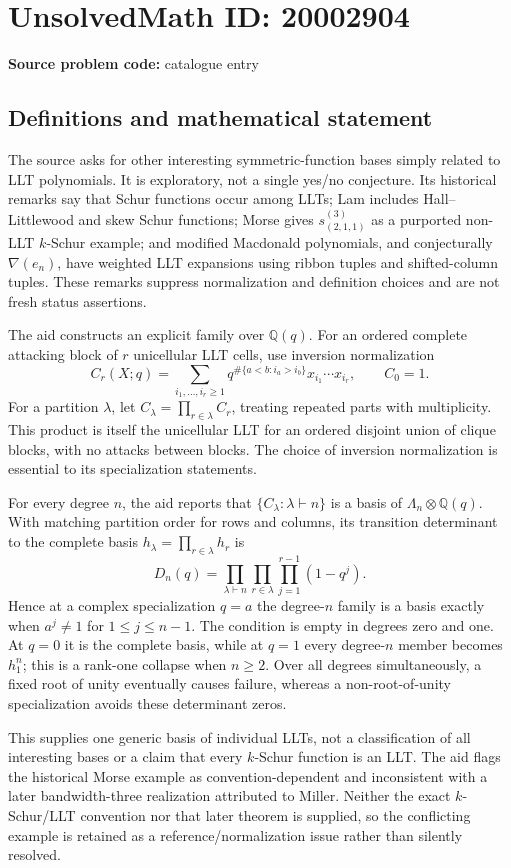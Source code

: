 \documentclass[11pt]{article}
\newcommand{\Q}{\mathbb{Q}}
\begin{document}
\section*{UnsolvedMath ID: 20002904}
\textbf{Source problem code:} catalogue entry
\subsection{Definitions and mathematical statement}
The source asks for other interesting symmetric-function bases simply related to LLT polynomials. It is exploratory, not a single yes/no conjecture. Its historical remarks say that Schur functions occur among LLTs; Lam includes Hall--Littlewood and skew Schur functions; Morse gives $s^{(3)}_{(2,1,1)}$ as a purported non-LLT $k$-Schur example; and modified Macdonald polynomials, and conjecturally $\nabla(e_n)$, have weighted LLT expansions using ribbon tuples and shifted-column tuples. These remarks suppress normalization and definition choices and are not fresh status assertions.

The aid constructs an explicit family over $\Q(q)$. For an ordered complete attacking block of $r$ unicellular LLT cells, use inversion normalization
\[
 C_r(X;q)=\sum_{i_1,\ldots,i_r\ge1}
 q^{\#\{a<b:i_a>i_b\}}x_{i_1}\cdots x_{i_r},\qquad C_0=1.
\]
For a partition $\lambda$, let $C_\lambda=\prod_{r\in\lambda}C_r$, treating repeated parts with multiplicity. This product is itself the unicellular LLT for an ordered disjoint union of clique blocks, with no attacks between blocks. The choice of inversion normalization is essential to its specialization statements.

For every degree $n$, the aid reports that $\{C_\lambda:\lambda\vdash n\}$ is a basis of $\Lambda_n\otimes\Q(q)$. With matching partition order for rows and columns, its transition determinant to the complete basis $h_\lambda=\prod_{r\in\lambda}h_r$ is
\[
 D_n(q)=\prod_{\lambda\vdash n}\prod_{r\in\lambda}
 \prod_{j=1}^{r-1}(1-q^j).
\]
Hence at a complex specialization $q=a$ the degree-$n$ family is a basis exactly when $a^j\ne1$ for $1\le j\le n-1$. The condition is empty in degrees zero and one. At $q=0$ it is the complete basis, while at $q=1$ every degree-$n$ member becomes $h_1^n$; this is a rank-one collapse when $n\ge2$. Over all degrees simultaneously, a fixed root of unity eventually causes failure, whereas a non-root-of-unity specialization avoids these determinant zeros.

This supplies one generic basis of individual LLTs, not a classification of all interesting bases or a claim that every $k$-Schur function is an LLT. The aid flags the historical Morse example as convention-dependent and inconsistent with a later bandwidth-three realization attributed to Miller. Neither the exact $k$-Schur/LLT convention nor that later theorem is supplied, so the conflicting example is retained as a reference/normalization issue rather than silently resolved.
\end{document}
